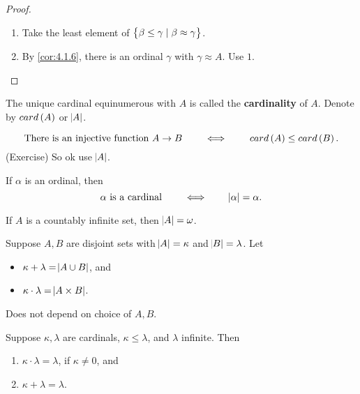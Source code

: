 \begin{proof}
\hfill
\begin{enumerate}
\item Take the least element of $ \cbr{\beta \le \gamma \mid \beta \approx \gamma} $.
\item By \ref{cor:4.1.6}, there is an ordinal $ \gamma $ with $ \gamma \approx A $. Use $ 1 $.
\end{enumerate}
\end{proof}

\begin{definition}
The unique cardinal equinumerous with $ A $ is called the \textbf{cardinality} of $ A $. Denote by $ card\br{A} $ or $ \abs{A} $.
\end{definition}

\begin{remark*}
$$ \text{There is an injective function} \ A \to B \qquad \iff \qquad card\br{A} \le card\br{B}. $$
(Exercise) So ok use $ \abs{A} $.
\end{remark*}

If $ \alpha $ is an ordinal, then
$$ \alpha \ \text{is a cardinal} \qquad \iff \qquad \abs{\alpha} = \alpha. $$

\begin{example*}
If $ A $ is a countably infinite set, then $ \abs{A} = \omega $.
\end{example*}

\begin{definition}
Suppose $ A, B $ are disjoint sets with $ \abs{A} = \kappa $ and $ \abs{B} = \lambda $. Let
\begin{itemize}
\item $ \kappa + \lambda = \abs{A \cup B} $, and
\item $ \kappa \cdot \lambda = \abs{A \times B} $.
\end{itemize}
\end{definition}

\begin{remark*}
Does not depend on choice of $ A, B $.
\end{remark*}

\begin{theorem}
\label{thm:4.2.5}
Suppose $ \kappa, \lambda $ are cardinals, $ \kappa \le \lambda $, and $ \lambda $ infinite. Then
\begin{enumerate}
\item $ \kappa \cdot \lambda = \lambda $, if $ \kappa \ne 0 $, and
\item $ \kappa + \lambda = \lambda $.
\end{enumerate}
\end{theorem}

